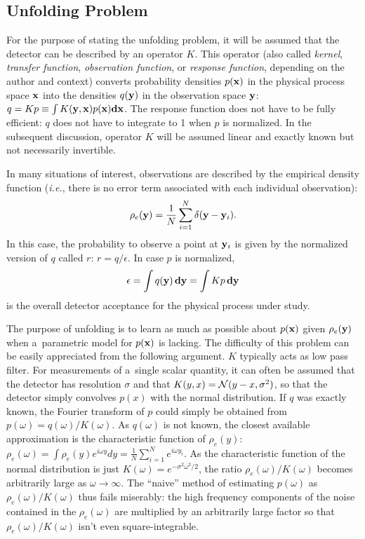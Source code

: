 \documentclass[12pt,titlepage]{article}
\begin{document}
\subsection{Unfolding Problem}

For the purpose of stating the unfolding problem,
it will be assumed that the detector can be described by an
operator $K$. This operator (also called {\it kernel},
{\it transfer function}, {\it observation function},
or {\it response function}, depending on the author and context)
converts probability
densities $p({\bf x})$
in the physical process space ${\bf x}$ into the densities $q({\bf y})$ in the
observation space ${\bf y}$: 
$q = K p \equiv \int K({\bf y}, {\bf x}) p({\bf x}) {\bf dx}$.
The response function does not have
to be fully efficient: $q$ does not have to integrate to 1 when
$p$ is normalized. In the subsequent discussion, operator $K$ will be assumed
linear and exactly known but not necessarily invertible.

In many situations of interest, observations are described by the empirical 
density function ({\it i.e.}, there is no error term associated with
each individual observation):
\begin{equation}
\rho_e({\bf y}) = \frac{1}{N} \sum_{i=1}^{N} \delta({\bf y} - {\bf y}_i).
\end{equation}
In this case, the probability to observe a point at ${\bf y}_i$ is given by
the normalized version of $q$ called $r$: $r = q/\epsilon$.
In case $p$ is normalized,
\begin{equation}
\epsilon = \int q({\bf y}) \,{\bf dy} = \int K p \,{\bf dy}
\label{eq:efficiency}
\end{equation}
is the overall detector
acceptance for the physical process under study.

The purpose of unfolding is to learn as much as possible about $p({\bf x})$ 
given $\rho_e({\bf y})$ when a~parametric model for $p({\bf x})$ is lacking.
The difficulty of this problem can be easily appreciated from the following
argument. $K$ typically acts as low pass filter. For measurements of
a~single scalar quantity, it can often be assumed that the detector
has resolution $\sigma$ and that $K(y, x) = {\cal N}(y - x, \sigma^2)$, so that
the detector simply convolves $p(x)$ with the normal distribution.
If $q$ was exactly known, the Fourier transform of $p$ could simply
be obtained from $p(\omega) = q(\omega)/K(\omega)$. As $q(\omega)$ is
not known, the closest available approximation is the characteristic
function of $\rho_e(y)$:
$\rho_e(\omega) = \int \rho_e(y) e^{i \omega y} dy = \frac{1}{N} \sum_{i=1}^{N} e^{i \omega y_i}$. As the characteristic function of the normal
distribution is just $K(\omega) = e^{-\sigma^2 \omega^2/2}$, the ratio
$\rho_e(\omega)/K(\omega)$ becomes arbitrarily large
as $\omega \rightarrow \infty$. The ``naive'' method of
estimating $p(\omega)$ as $\rho_e(\omega)/K(\omega)$ thus fails
miserably: the high frequency components of the noise contained
in the $\rho_e(\omega)$ are multiplied by an arbitrarily large factor
so that $\rho_e(\omega)/K(\omega)$ isn't even square-integrable.
\end{document}
